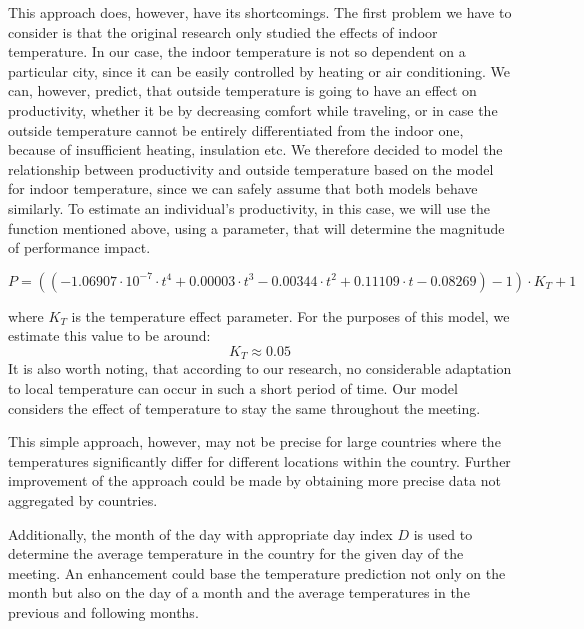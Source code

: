 This approach does, however, have its shortcomings. The first problem we have to consider is that the original research only studied the effects of indoor temperature. In our case, the indoor temperature is not so dependent on a particular city, since it can be easily controlled by heating or air conditioning. We can, however, predict, that outside temperature is going to have an effect on productivity, whether it be by decreasing comfort while traveling, or in case the outside temperature cannot be entirely differentiated from the indoor one, because of insufficient heating, insulation etc. We therefore decided to model the relationship between productivity and outside temperature based on the model for indoor temperature, since we can safely assume that both models behave similarly. To estimate an individual's productivity, in this case, we will use the function mentioned above, using a parameter, that will determine the magnitude of performance impact.

$$P=\left( (-1.06907 \cdot 10^{-7} \cdot t^{4}+0.00003 \cdot t^{3}-0.00344 \cdot t^{2}+0.11109 \cdot t-0.08269)-1 \right)\cdot K_{T}+1$$

\noindent where $K_{T}$ is the temperature effect parameter. For the purposes of this model, we estimate this value to be around:
$$K_{T}\approx 0.05$$
It is also worth noting, that according to our research, no considerable adaptation to local temperature can occur in such a short period of time. Our model considers the effect of temperature to stay the same throughout the meeting.

This simple approach, however, may not be precise for large countries where the temperatures significantly differ for different locations within the country. Further improvement of the approach could be made by obtaining more precise data not aggregated by countries.

Additionally, the month of the day with appropriate day index $D$ is used to determine the average temperature in the country for the given day of the meeting. An enhancement could base the temperature prediction not only on the month but also on the day of a month and the average temperatures in the previous and following months.
